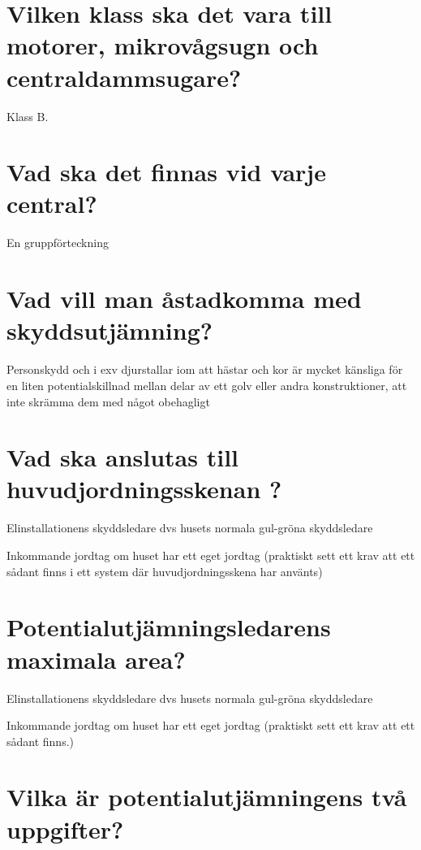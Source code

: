 \documentclass[a4paper,swedish]{article}
\begin{document}
\setcounter{section}{15}
\section{Vilken klass ska det vara till motorer, mikrovågsugn och centraldammsugare?}\label{sec:RCD_motordrift}

Klass B.

\setcounter{section}{17}
\section{Vad ska det finnas vid varje central?}\label{sec:vad_ska_finnas_vid_en_central}

En gruppförteckning

\setcounter{section}{19}
\section{Vad vill man åstadkomma med skyddsutjämning?}\label{sec:skyddsutjamning}

Personskydd och i exv djurstallar iom att hästar och kor är mycket känsliga för en liten potentialskillnad
mellan delar av ett golv eller andra konstruktioner, att inte skrämma dem med något obehagligt

\setcounter{section}{21}
\section{Vad ska anslutas till huvudjordningsskenan ?}\label{sec:huvudjordningsskenan}

Elinstallationens skyddsledare dvs husets normala gul-gröna skyddsledare

Inkommande jordtag om huset har ett eget jordtag (praktiskt sett ett krav att ett sådant finns i ett system där huvudjordningsskena har använts)

\setcounter{section}{23}
\section{Potentialutjämningsledarens maximala area?}\label{sec:potentialutjamningarea}

Elinstallationens skyddsledare dvs husets normala gul-gröna skyddsledare

Inkommande jordtag om huset har ett eget jordtag (praktiskt sett ett krav att ett sådant finns.)

\setcounter{section}{25}
\section{Vilka är potentialutjämningens två uppgifter?}\label{sec:potentialutjamningsuppgifter}
\end{document}
